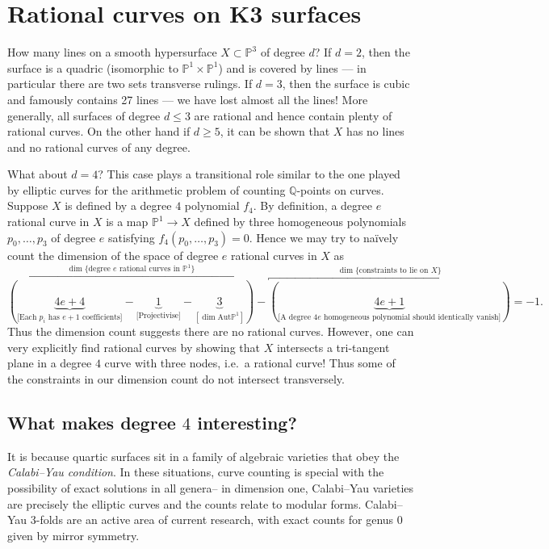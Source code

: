 \section{Rational curves on K3 surfaces}
How many lines on a smooth hypersurface \(X\subset \mathbb{P}^3\) of degree
\(d\)? If \(d=2\), then the surface is a quadric (isomorphic to
\(\mathbb{P}^1\times \mathbb{P}^1\)) and is covered by lines --- in particular
there are two sets transverse rulings. If \(d=3\), then the surface is cubic
and famously contains 27 lines --- we have lost almost all the lines! More
generally, all surfaces of degree \(d\leq 3\) are rational and hence contain
plenty of rational curves. On the other hand if \(d\geq 5\), it can be
shown that \(X\) has no lines and no rational curves of any degree.

What about \(d=4\)? This case plays a transitional role similar to the one
played by elliptic curves for the arithmetic problem of counting
\(\mathbb{Q}\)-points on curves. Suppose \(X\) is defined by a degree \(4\)
polynomial \(f_4\). By definition, a degree \(e\) rational curve in \(X\) is a
map \(\mathbb{P}^1\to X\) defined by three homogeneous polynomials
\(p_0,\ldots,p_3\) of degree \(e\) satisfying \(f_4(p_0,\ldots,p_3)=0\). Hence we may
try to na\"ively count the dimension of the space of degree \(e\) rational
curves in \(X\) as
\[
    \overbracket{(
        \underbrace{4e+4}_\text{[Each \(p_i\) has \(e+1\) coefficients]}
        -\underbrace{1}_\text{[Projectivise]}
        -\underbrace{3}_{[\dim\text{Aut}\mathbb{P}^1]})}
    ^{\dim\{\text{degree \(e\) rational curves in \(\mathbb{P}^1\)}\}}
    -\overbracket{
        (\underbrace{4e+1}_\text{[A degree \(4e\) homogeneous polynomial
        should identically vanish]})}
    ^{\dim\{\text{constraints to lie on \(X\)}\}}
    =-1.
\]
Thus the dimension count suggests there are no rational curves. However, one can
very explicitly find rational curves by showing that \(X\) intersects a
tri-tangent plane in a degree \(4\) curve with three nodes, i.e.\ a rational
curve! Thus some of the constraints in our dimension count do not intersect transversely.

\subsection{What makes degree \(4\) interesting?} It is because quartic surfaces
sit in a family of algebraic varieties that obey the \textit{Calabi--Yau
condition}. In these situations, curve counting is special with the possibility
of exact solutions in all genera-- in dimension one, Calabi--Yau varieties are
precisely the elliptic curves and the counts relate to modular forms.
Calabi--Yau 3-folds are an active area of current research, with exact counts
for genus \(0\) given by mirror symmetry.

